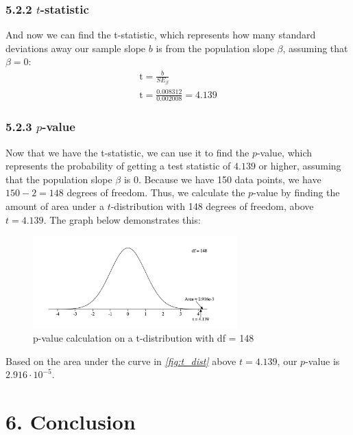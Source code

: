 \documentclass[12pt]{article}
\begin{document}
    \subsubsection*{5.2.2 $t$-statistic}
    \noindent And now we can find the t-statistic, which represents how many standard deviations away our sample slope $b$ is from the population slope $\beta$, assuming that $\beta=0$:
    \begin{gather*}
        \mathrm{t} = \frac{b}{SE_\beta} \\[1em]
        \mathrm{t} = \frac{0.008312}{0.002008} = 4.139
    \end{gather*}

    \subsubsection*{5.2.3 $p$-value}
    \noindent Now that we have the t-statistic, we can use it to find the $p$-value, which represents the probability of getting a test statistic
    of $4.139$ or higher, assuming that the population slope $\beta$ is $0$. Because we have 150 data points, we have $150 - 2 = 148$ degrees of freedom.
    Thus, we calculate the $p$-value by finding the amount of area under a $t$-distribution with 148 degrees of freedom, above $t=4.139$. The graph below demonstrates this:

    \begin{figure}[H]
        \centering
        \includegraphics[width=0.7\textwidth]{Images/tdistribution}
        \caption{p-value calculation on a t-distribution with df = 148}
        \label{fig:t_dist}
    \end{figure}

    \noindent Based on the area under the curve in \textit{\autoref{fig:t_dist}} above $t=4.139$, our $p$-value is $2.916\cdot10^{-5}$.

    \section*{6. Conclusion}
\end{document}
